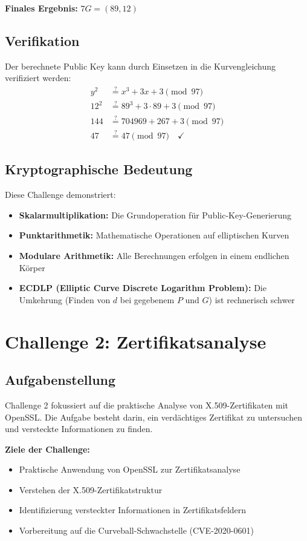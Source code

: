 \documentclass{article}
\begin{document}
\textbf{Finales Ergebnis:} $7G = (89, 12)$

\subsection{Verifikation}
Der berechnete Public Key kann durch Einsetzen in die Kurvengleichung verifiziert werden:
\begin{align}
y^2 &\stackrel{?}{=} x^3 + 3x + 3 \pmod{97} \\
12^2 &\stackrel{?}{=} 89^3 + 3 \cdot 89 + 3 \pmod{97} \\
144 &\stackrel{?}{=} 704969 + 267 + 3 \pmod{97} \\
47 &\stackrel{?}{=} 47 \pmod{97} \quad \checkmark
\end{align}

\subsection{Kryptographische Bedeutung}
Diese Challenge demonstriert:
\begin{itemize}
    \item \textbf{Skalarmultiplikation:} Die Grundoperation für Public-Key-Generierung
    \item \textbf{Punktarithmetik:} Mathematische Operationen auf elliptischen Kurven
    \item \textbf{Modulare Arithmetik:} Alle Berechnungen erfolgen in einem endlichen Körper
    \item \textbf{ECDLP (Elliptic Curve Discrete Logarithm Problem):} Die Umkehrung (Finden von $d$ bei gegebenem $P$ und $G$) ist rechnerisch schwer
\end{itemize}



\section{Challenge 2: Zertifikatsanalyse}

\subsection{Aufgabenstellung}
Challenge 2 fokussiert auf die praktische Analyse von X.509-Zertifikaten mit OpenSSL. Die Aufgabe besteht darin, ein verdächtiges Zertifikat zu untersuchen und versteckte Informationen zu finden.

\noindent
\textbf{Ziele der Challenge:}
\begin{itemize}
    \item Praktische Anwendung von OpenSSL zur Zertifikatsanalyse
    \item Verstehen der X.509-Zertifikatstruktur
    \item Identifizierung versteckter Informationen in Zertifikatsfeldern
    \item Vorbereitung auf die Curveball-Schwachstelle (CVE-2020-0601)
\end{itemize}
\end{document}
